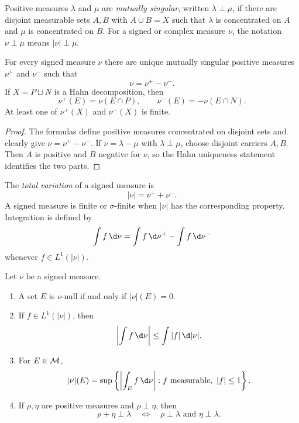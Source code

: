 \begin{de}
Positive measures $\lambda$ and $\mu$ are \emph{mutually singular}, written $\lambda\perp\mu$, if there are disjoint measurable sets $A,B$ with $A\cup B=X$ such that $\lambda$ is concentrated on $A$ and $\mu$ is concentrated on $B$. For a signed or complex measure $\nu$, the notation $\nu\perp\mu$ means $|\nu|\perp\mu$.
\end{de}

\begin{thm}
For every signed measure $\nu$ there are unique mutually singular positive measures $\nu^+$ and $\nu^-$ such that
\[
\nu=\nu^+-\nu^-.
\]
If $X=P\sqcup N$ is a Hahn decomposition, then
\[
\nu^+(E)=\nu(E\cap P),
\qquad
\nu^-(E)=-\nu(E\cap N).
\]
At least one of $\nu^+(X)$ and $\nu^-(X)$ is finite.
\end{thm}

\begin{proof}
The formulas define positive measures concentrated on disjoint sets and clearly give $\nu=\nu^+-\nu^-$. If $\nu=\lambda-\mu$ with $\lambda\perp\mu$, choose disjoint carriers $A,B$. Then $A$ is positive and $B$ negative for $\nu$, so the Hahn uniqueness statement identifies the two parts.
\end{proof}

\begin{de}
The \emph{total variation} of a signed measure is
\[
|\nu|=\nu^++\nu^-.
\]
A signed measure is finite or $\sigma$-finite when $|\nu|$ has the corresponding property. Integration is defined by
\[
\int f\,\d\nu=\int f\,\d\nu^+-\int f\,\d\nu^-
\]
whenever $f\in L^1(|\nu|)$.
\end{de}

\begin{prop}
Let $\nu$ be a signed measure.
\begin{enumerate}
  \item A set $E$ is $\nu$-null if and only if $|\nu|(E)=0$.
  \item If $f\in L^1(|\nu|)$, then
  \[
  \left|\int f\,\d\nu\right|\leq\int|f|\,\d|\nu|.
  \]
  \item For $E\in\mathcal{M}$,
  \[
  |\nu|(E)=\sup\left\{\left|\int_E f\,\d\nu\right|:f\text{ measurable},\ |f|\leq1\right\}.
  \]
  \item If $\rho,\eta$ are positive measures and $\rho\perp\eta$, then
  \[
  \rho+\eta\perp\lambda
  \quad\Longleftrightarrow\quad
  \rho\perp\lambda\text{ and }\eta\perp\lambda.
  \]
\end{enumerate}
\end{prop}

